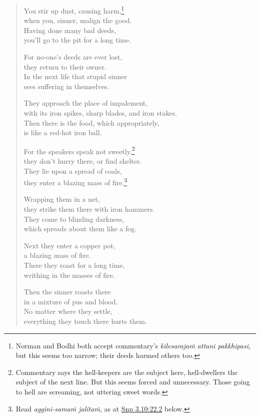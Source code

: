 \documentclass[12pt,openany]{book}%
\begin{document}
\begin{verse}
You stir up dust, causing harm,\footnote{Norman and Bodhi both accept commentary’s \textit{\textsanskrit{kilesarajaṁ} attani pakkhipasi}, but this seems too narrow; their deeds harmed others too. } \\
when you, sinner, malign the good. \\
Having done many bad deeds, \\
you’ll go to the pit for a long time. 

For no-one’s deeds are ever lost, \\
they return to their owner. \\
In the next life that stupid sinner \\
sees suffering in themselves. 

They approach the place of impalement, \\
with its iron spikes, sharp blades, and iron stakes. \\
Then there is the food, which appropriately, \\
is like a red-hot iron ball. 

For the speakers speak not sweetly,\footnote{Commentary says the hell-keepers are the subject here, hell-dwellers the subject of the next line. But this seems forced and unnecessary. Those going to hell are screaming, not uttering sweet words. } \\
they don’t hurry there, or find shelter. \\
They lie upon a spread of coals, \\
they enter a blazing mass of fire.\footnote{Read \textit{aggini-\textsanskrit{samaṁ} \textsanskrit{jalitaṁ}}, as at \href{https://suttacentral.net/snp3.10/en/sujato\#22.2}{Snp 3.10:22.2} below. } 

Wrapping them in a net, \\
they strike them there with iron hammers. \\
They come to blinding darkness, \\
which spreads about them like a fog. 

Next they enter a copper pot, \\
a blazing mass of fire. \\
There they roast for a long time, \\
writhing in the masses of fire. 

Then the sinner roasts there \\
in a mixture of pus and blood. \\
No matter where they settle, \\
everything they touch there hurts them. 


\end{verse}
\end{document}
